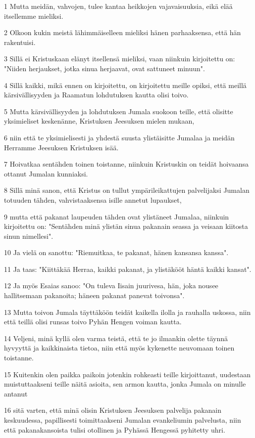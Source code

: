\par 1 Mutta meidän, vahvojen, tulee kantaa heikkojen vajavaisuuksia, eikä elää itsellemme mieliksi.
\par 2 Olkoon kukin meistä lähimmäiselleen mieliksi hänen parhaaksensa, että hän rakentuisi.
\par 3 Sillä ei Kristuskaan elänyt itsellensä mieliksi, vaan niinkuin kirjoitettu on: "Niiden herjaukset, jotka sinua herjaavat, ovat sattuneet minuun".
\par 4 Sillä kaikki, mikä ennen on kirjoitettu, on kirjoitettu meille opiksi, että meillä kärsivällisyyden ja Raamatun lohdutuksen kautta olisi toivo.
\par 5 Mutta kärsivällisyyden ja lohdutuksen Jumala suokoon teille, että olisitte yksimieliset keskenänne, Kristuksen Jeesuksen mielen mukaan,
\par 6 niin että te yksimielisesti ja yhdestä suusta ylistäisitte Jumalaa ja meidän Herramme Jeesuksen Kristuksen isää.
\par 7 Hoivatkaa sentähden toinen toistanne, niinkuin Kristuskin on teidät hoivaansa ottanut Jumalan kunniaksi.
\par 8 Sillä minä sanon, että Kristus on tullut ympärileikattujen palvelijaksi Jumalan totuuden tähden, vahvistaaksensa isille annetut lupaukset,
\par 9 mutta että pakanat laupeuden tähden ovat ylistäneet Jumalaa, niinkuin kirjoitettu on: "Sentähden minä ylistän sinua pakanain seassa ja veisaan kiitosta sinun nimellesi".
\par 10 Ja vielä on sanottu: "Riemuitkaa, te pakanat, hänen kansansa kanssa".
\par 11 Ja taas: "Kiittäkää Herraa, kaikki pakanat, ja ylistäkööt häntä kaikki kansat".
\par 12 Ja myös Esaias sanoo: "On tuleva Iisain juurivesa, hän, joka nousee hallitsemaan pakanoita; häneen pakanat panevat toivonsa".
\par 13 Mutta toivon Jumala täyttäköön teidät kaikella ilolla ja rauhalla uskossa, niin että teillä olisi runsas toivo Pyhän Hengen voiman kautta.
\par 14 Veljeni, minä kyllä olen varma teistä, että te jo ilmankin olette täynnä hyvyyttä ja kaikkinaista tietoa, niin että myös kykenette neuvomaan toinen toistanne.
\par 15 Kuitenkin olen paikka paikoin jotenkin rohkeasti teille kirjoittanut, uudestaan muistuttaakseni teille näitä asioita, sen armon kautta, jonka Jumala on minulle antanut
\par 16 sitä varten, että minä olisin Kristuksen Jeesuksen palvelija pakanain keskuudessa, papillisesti toimittaakseni Jumalan evankeliumin palvelusta, niin että pakanakansoista tulisi otollinen ja Pyhässä Hengessä pyhitetty uhri.
